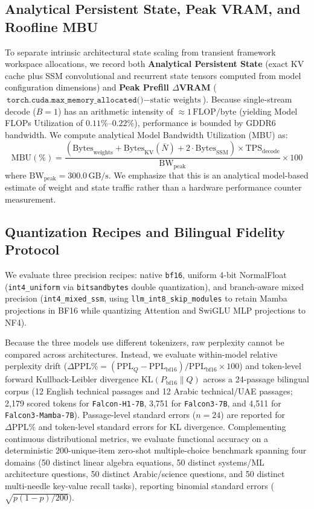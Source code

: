 \documentclass[10pt,a4paper]{article}
\begin{document}
\subsection{Analytical Persistent State, Peak VRAM, and Roofline MBU}
To separate intrinsic architectural state scaling from transient framework workspace allocations, we record both \textbf{Analytical Persistent State} (exact KV cache plus SSM convolutional and recurrent state tensors computed from model configuration dimensions) and \textbf{Peak Prefill $\Delta$VRAM} ($\texttt{torch.cuda.max\_memory\_allocated()} - \text{static weights}$). Because single-stream decode ($B=1$) has an arithmetic intensity of $\approx 1\,\text{FLOP/byte}$ (yielding Model FLOPs Utilization of $0.11\%\text{--}0.22\%$), performance is bounded by GDDR6 bandwidth. We compute analytical Model Bandwidth Utilization (MBU) as:
\begin{equation}
\mathrm{MBU}(\%) = \frac{\left(\mathrm{Bytes}_{\mathrm{weights}} + \mathrm{Bytes}_{\mathrm{KV}}(\bar{N}) + 2 \cdot \mathrm{Bytes}_{\mathrm{SSM}}\right) \times \mathrm{TPS}_{\mathrm{decode}}}{\mathrm{BW}_{\mathrm{peak}}} \times 100
\end{equation}
where $\mathrm{BW}_{\mathrm{peak}} = 300.0\,\text{GB/s}$. We emphasize that this is an analytical model-based estimate of weight and state traffic rather than a hardware performance counter measurement.

\subsection{Quantization Recipes and Bilingual Fidelity Protocol}
We evaluate three precision recipes: native \texttt{bf16}, uniform 4-bit NormalFloat (\texttt{int4\_uniform} via \texttt{bitsandbytes} double quantization), and branch-aware mixed precision (\texttt{int4\_mixed\_ssm}, using \texttt{llm\_int8\_skip\_modules} to retain Mamba projections in BF16 while quantizing Attention and SwiGLU MLP projections to NF4).

Because the three models use different tokenizers, raw perplexity cannot be compared across architectures. Instead, we evaluate within-model relative perplexity drift ($\Delta\text{PPL}\% = (\mathrm{PPL}_Q - \mathrm{PPL}_{\mathrm{bf16}}) / \mathrm{PPL}_{\mathrm{bf16}} \times 100$) and token-level forward Kullback-Leibler divergence $\mathrm{KL}(P_{\mathrm{bf16}} \parallel Q)$ across a 24-passage bilingual corpus (12 English technical passages and 12 Arabic technical/UAE passages; 2,179 scored tokens for \texttt{Falcon-H1-7B}, 3,751 for \texttt{Falcon3-7B}, and 4,511 for \texttt{Falcon3-Mamba-7B}). Passage-level standard errors ($n=24$) are reported for $\Delta\text{PPL}\%$ and token-level standard errors for KL divergence. Complementing continuous distributional metrics, we evaluate functional accuracy on a deterministic 200-unique-item zero-shot multiple-choice benchmark spanning four domains (50 distinct linear algebra equations, 50 distinct systems/ML architecture questions, 50 distinct Arabic/science questions, and 50 distinct multi-needle key-value recall tasks), reporting binomial standard errors ($\sqrt{p(1-p)/200}$).
\end{document}
